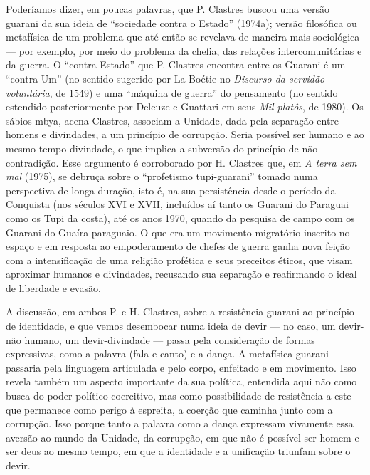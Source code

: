 Poderíamos dizer, em poucas palavras, que P. Clastres buscou uma versão
guarani da sua ideia de ``sociedade contra o Estado'' (1974a); versão
filosófica ou metafísica de um problema que até então se revelava de
maneira mais sociológica --- por exemplo, por meio do problema da
chefia, das relações intercomunitárias e da guerra. O ``contra-Estado''
que P. Clastres encontra entre os Guarani é um ``contra-Um'' (no sentido
sugerido por La Boétie no \emph{Discurso da servidão voluntária}, de
1549) e uma ``máquina de guerra'' do pensamento (no sentido estendido
posteriormente por Deleuze e Guattari em seus \emph{Mil platôs}, de
1980). Os sábios mbya, acena Clastres, associam a Unidade, dada pela
separação entre homens e divindades, a um princípio de corrupção. Seria
possível ser humano e ao mesmo tempo divindade, o que implica a
subversão do princípio de não contradição. Esse argumento é corroborado
por H. Clastres que, em \emph{A terra sem mal} (1975), se debruça sobre
o ``profetismo tupi-guarani'' tomado numa perspectiva de longa duração,
isto é, na sua persistência desde o período da Conquista (nos séculos
XVI e XVII, incluídos aí tanto os Guarani do Paraguai como os Tupi da
costa), até os anos 1970, quando da pesquisa de campo com os Guarani do
Guaíra paraguaio. O que era um movimento migratório inscrito no espaço e
em resposta ao empoderamento de chefes de guerra ganha nova feição com a
intensificação de uma religião profética e seus preceitos éticos, que
visam aproximar humanos e divindades, recusando sua separação e
reafirmando o ideal de liberdade e evasão.

A discussão, em ambos P. e H. Clastres, sobre a resistência guarani ao
princípio de identidade, e que vemos desembocar numa ideia de devir ---
no caso, um devir-não humano, um devir-divindade --- passa pela
consideração de formas expressivas, como a palavra (fala e canto) e a
dança. A metafísica guarani passaria pela linguagem articulada e pelo
corpo, enfeitado e em movimento. Isso revela também um aspecto
importante da sua política, entendida aqui não como busca do poder
político coercitivo, mas como possibilidade de resistência a este que
permanece como perigo à espreita, a coerção que caminha junto com a
corrupção. Isso porque tanto a palavra como a dança expressam vivamente
essa aversão ao mundo da Unidade, da corrupção, em que não é possível
ser homem e ser deus ao mesmo tempo, em que a identidade e a unificação
triunfam sobre o devir.

